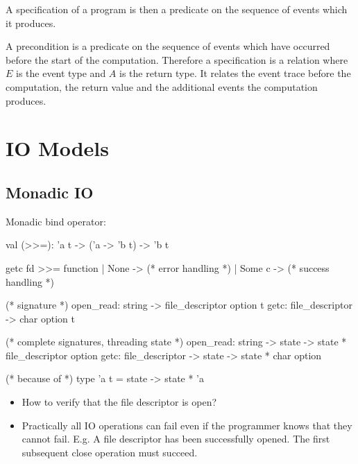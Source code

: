 A specification of a program is then a predicate on the sequence of events which
it produces.

A precondition is a predicate on the sequence of events which have occurred
before the start of the computation. Therefore a specification is a relation
 where $E$ is the event type and $A$
is the return type. It relates the event trace before the computation, the
return value and the additional events the computation produces.





\section{IO Models}



\subsection{Monadic IO}

\noindent Monadic bind operator:
\begin{ocaml}
  val (>>=): 'a t -> ('a -> 'b t) -> 'b t
\end{ocaml}


\begin{ocaml}
  getc fd >>= function
  | None ->
    (* error handling *)
  | Some c ->
    (* success handling *)

  (* signature *)
  open_read: string -> file_descriptor option t
  getc: file_descriptor -> char option t

  (* complete signatures, threading state *)
  open_read: string -> state -> state * file_descriptor option
  getc: file_descriptor -> state -> state * char option

  (* because of *)
  type 'a t = state -> state * 'a
\end{ocaml}
%

\begin{itemize}
\item How to verify that the file descriptor is open?


\item Practically all IO operations can fail even if the programmer knows that
  they cannot fail. E.g. A file descriptor has been successfully opened. The
  first subsequent close operation must succeed.

\end{itemize}


